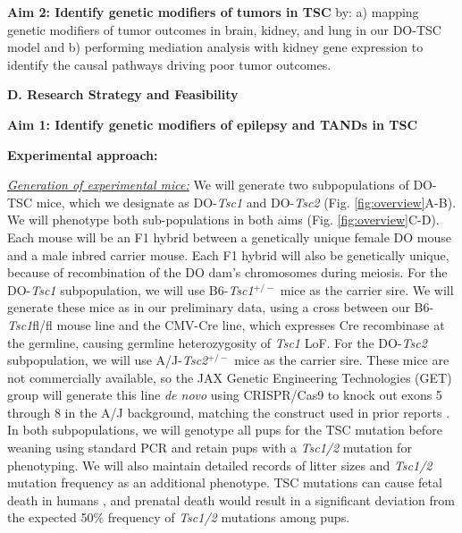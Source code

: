 \documentclass[
  12pt,
]{article}
\begin{document}
\textbf{Aim 2: Identify genetic modifiers of tumors in TSC} by: a)
mapping genetic modifiers of tumor outcomes in brain, kidney, and lung
in our DO-TSC model and b) performing mediation analysis with kidney
gene expression to identify the causal pathways driving poor tumor
outcomes.

\textbf{D. Research Strategy and Feasibility}

\textbf{Aim 1: Identify genetic modifiers of epilepsy and TANDs in TSC}

\textbf{Experimental approach:}

\textit{\underline{Generation of experimental mice:}} We will generate
two subpopulations of DO-TSC mice, which we designate as
DO-\textit{Tsc1} and DO-\textit{Tsc2} (Fig. \ref{fig:overview}A-B). We
will phenotype both sub-populations in both aims (Fig.
\ref{fig:overview}C-D). Each mouse will be an F1 hybrid between a
genetically unique female DO mouse and a male inbred carrier mouse. Each
F1 hybrid will also be genetically unique, because of recombination of
the DO dam's chromosomes during meiosis. For the DO-\textit{Tsc1}
subpopulation, we will use B6-\textit{Tsc1}\(^{+/-}\) mice as the
carrier sire. We will generate these mice as in our preliminary data,
using a cross between our B6-\textit{Tsc1}fl/fl mouse line and the
CMV-Cre line, which expresses Cre recombinase at the germline, causing
germline heterozygosity of \textit{Tsc1} LoF. For the DO-\textit{Tsc2}
subpopulation, we will use A/J-\textit{Tsc2}\(^{+/-}\) mice as the
carrier sire. These mice are not commercially available, so the JAX
Genetic Engineering Technologies (GET) group will generate this line
\textit{de novo} using CRISPR/Cas9 to knock out exons 5 through 8 in the
A/J background, matching the construct used in prior reports
\cite{10491404, 20235887}. In both subpopulations, we will genotype all
pups for the TSC mutation before weaning using standard PCR and retain
pups with a \textit{Tsc1/2} mutation for phenotyping. We will also
maintain detailed records of litter sizes and \textit{Tsc1/2} mutation
frequency as an additional phenotype. TSC mutations can cause fetal
death in humans \cite{15731990, 28868251, 18236061}, and prenatal death
would result in a significant deviation from the expected 50\% frequency
of \textit{Tsc1/2} mutations among pups.
\end{document}
